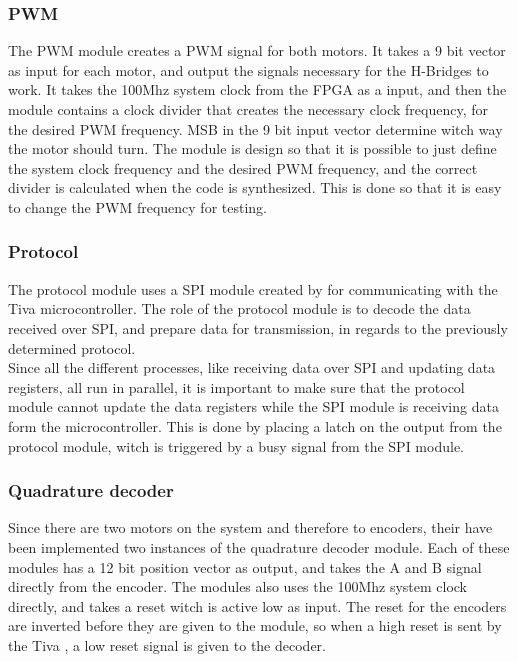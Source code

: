 \documentclass[../../../main]{subfiles}
\begin{document}
\subsubsection{PWM}
The PWM module creates a PWM signal for both motors. It takes a 9 bit vector as input for each motor, and output the signals necessary for the H-Bridges to work.
It takes the 100Mhz system clock from the FPGA as a input, and then the module contains a clock divider that creates the necessary clock frequency, for the desired PWM frequency. 
MSB in the 9 bit input vector determine witch way the motor should turn.
The module is design so  that it is possible to just  define the system clock frequency and the desired PWM frequency, and the correct divider is calculated when the code is synthesized.
This is done so that it is easy to change the PWM frequency for testing.
\subsubsection{Protocol}
The protocol module uses a SPI module created by  for communicating with the Tiva microcontroller. 
The role of the protocol module is to decode the data received over SPI, and prepare data for transmission, in regards to the previously determined protocol.
\\
Since all the different processes, like receiving data over SPI and updating data registers, all run in parallel, it is important to make sure that the protocol module cannot update the data registers while the SPI module is receiving data form the microcontroller.
This is done by placing a latch on the output from the protocol module, witch is triggered by a busy signal from the SPI module.

\subsubsection{Quadrature decoder}
Since there are two motors on the system and therefore to encoders, their have been implemented two instances of the quadrature decoder module.
Each of these modules has a 12 bit position vector as output, and takes the  A and B signal directly from the encoder. The modules also uses the 100Mhz system clock directly, and takes a reset witch  is active low as input.
The reset for the encoders are inverted before they are given to the module, so when a high reset is sent by the Tiva , a low reset signal is given to the decoder.
\end{document}

